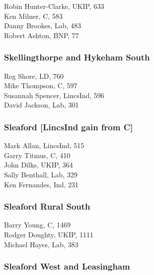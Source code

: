 \documentclass[a4paper,openany,10pt]{book}
\begin{document}


Robin Hunter-Clarke, UKIP, 633\\
Ken Milner, C, 583\\
Danny Brookes, Lab, 483\\
Robert Ashton, BNP, 77\\


\subsubsection*{Skellingthorpe and Hykeham South}



Reg Shore, LD, 760\\
Mike Thompson, C, 597\\
Susannah Spencer, LincsInd, 596\\
David Jackson, Lab, 301\\


\subsubsection*{Sleaford \hspace*{\fill}\nolinebreak[1]%
\enspace\hspace*{\fill}
[LincsInd gain from C]}



Mark Allan, LincsInd, 515\\
Garry Titmus, C, 410\\
John Dilks, UKIP, 364\\
Sally Benthall, Lab, 329\\
Ken Fernandes, Ind, 231\\


\subsubsection*{Sleaford Rural South}



Barry Young, C, 1469\\
Rodger Doughty, UKIP, 1111\\
Michael Hayes, Lab, 383\\


\subsubsection*{Sleaford West and Leasingham}
\end{document}
